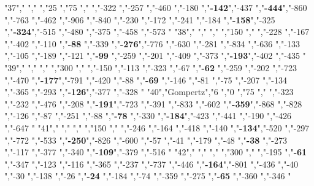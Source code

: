 "37","        ","     ","25  ","75  ","     ","-322          ","-257          ","-460          ","-180          ","\textbf{-142}","-437          ","\textbf{-444}","-860          ","-763          ","-462          ","-906          ","-840          ","-230          ","-172          ","-241          ","-184          ","\textbf{-158}","-325          ","\textbf{-324}","-515          ","-480          ","-375          ","-458          ","-573          "
"38","        ","     ","    ","150 ","     ","-228          ","-167          ","-402          ","-110          ","\textbf{-88} ","-339          ","\textbf{-276}","-776          ","-630          ","-281          ","-834          ","-636          ","-133          ","-105          ","-189          ","-121          ","\textbf{-99} ","-259          ","-201          ","-409          ","-373          ","\textbf{-193}","-402          ","-435          "
"39","        ","     ","    ","300 ","     ","-150          ","-113          ","-323          ","-67           ","\textbf{-62} ","-259          ","-202          ","-723          ","-470          ","\textbf{-177}","-791          ","-420          ","-88           ","\textbf{-69} ","-146          ","-81           ","-75           ","-207          ","-134          ","-365          ","-293          ","\textbf{-126}","-377          ","-328          "
"40","Gompertz","6    ","0   ","75  ","     ","-323          ","-232          ","-476          ","-208          ","\textbf{-191}","-723          ","-391          ","-833          ","-602          ","\textbf{-359}","-868          ","-828          ","-126          ","-87           ","-251          ","-88           ","\textbf{-78} ","-330          ","\textbf{-184}","-423          ","-441          ","-190          ","-426          ","-647          "
"41","        ","     ","    ","150 ","     ","-246          ","-164          ","-418          ","-140          ","\textbf{-134}","-520          ","-297          ","-772          ","-533          ","\textbf{-250}","-826          ","-600          ","-57           ","-41           ","-179          ","-48           ","\textbf{-38} ","-273          ","-117          ","-377          ","-340          ","\textbf{-109}","-379          ","-516          "
"42","        ","     ","    ","300 ","     ","-195          ","\textbf{-61} ","-347          ","-123          ","-116          ","-365          ","-237          ","-737          ","-446          ","\textbf{-164}","-801          ","-436          ","-40           ","-30           ","-138          ","-26           ","\textbf{-24} ","-184          ","-74           ","-359          ","-275          ","\textbf{-65} ","-360          ","-346          "
